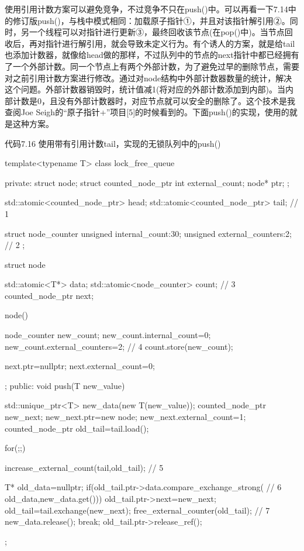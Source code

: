 使用引用计数方案可以避免竞争，不过竞争不只在push()中。可以再看一下7.14中的修订版push()，与栈中模式相同：加载原子指针①，并且对该指针解引用②。同时，另一个线程可以对指针进行更新③，最终回收该节点(在pop()中)。当节点回收后，再对指针进行解引用，就会导致未定义行为。有个诱人的方案，就是给tail也添加计数器，就像给head做的那样，不过队列中的节点的next指针中都已经拥有了一个外部计数。同一个节点上有两个外部计数，为了避免过早的删除节点，需要对之前引用计数方案进行修改。通过对node结构中外部计数器数量的统计，解决这个问题。外部计数器销毁时，统计值减1(将对应的外部计数添加到内部)。当内部计数是0，且没有外部计数器时，对应节点就可以安全的删除了。这个技术是我查阅Joe Seigh的“原子指针+”项目[5]的时候看到的。下面push()的实现，使用的就是这种方案。

代码7.16 使用带有引用计数tail，实现的无锁队列中的push()

\begin{cpp}
template<typename T>
class lock_free_queue
{
private:
  struct node;
  struct counted_node_ptr
  {
    int external_count;
    node* ptr;
  };

  std::atomic<counted_node_ptr> head;
  std::atomic<counted_node_ptr> tail;  // 1

  struct node_counter
  {
    unsigned internal_count:30;
    unsigned external_counters:2;  // 2
  };

  struct node
  {
    std::atomic<T*> data;
    std::atomic<node_counter> count;  // 3
    counted_node_ptr next;

    node()
    {
      node_counter new_count;
      new_count.internal_count=0;
      new_count.external_counters=2;  // 4
      count.store(new_count);

      next.ptr=nullptr;
      next.external_count=0;
     }
  };
public:
  void push(T new_value)
  {
    std::unique_ptr<T> new_data(new T(new_value));
    counted_node_ptr new_next;
    new_next.ptr=new node;
    new_next.external_count=1;
    counted_node_ptr old_tail=tail.load();

    for(;;)
    {
      increase_external_count(tail,old_tail);  // 5

      T* old_data=nullptr;
      if(old_tail.ptr->data.compare_exchange_strong(  // 6
           old_data,new_data.get()))
      {
        old_tail.ptr->next=new_next;
        old_tail=tail.exchange(new_next);
        free_external_counter(old_tail);  // 7
        new_data.release();
        break;
      }
      old_tail.ptr->release_ref();
    }
  }
};
\end{cpp}

